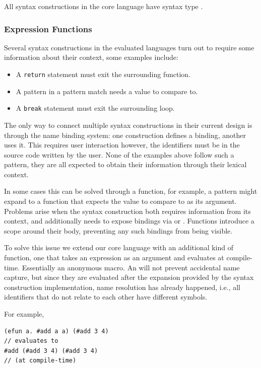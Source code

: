 \documentclass{kththesis}
\begin{document}
All syntax constructions in the core language have syntax type .

\subsubsection{Expression Functions} \label{sec:efun-drawbacks}

Several syntax constructions in the evaluated languages turn out to require some information about their context, some examples include:

\begin{itemize}
  \item A \texttt{return} statement must exit the surrounding function.
  \item A pattern in a pattern match needs a value to compare to.
  \item A \texttt{break} statement must exit the surrounding loop.
\end{itemize}

The only way to connect multiple syntax constructions in their current design is through the name binding system: one construction defines a binding, another uses it. This requires user interaction however, the identifiers must be in the source code written by the user. None of the examples above follow such a pattern, they are all expected to obtain their information through their lexical context.

In some cases this can be solved through a function, for example, a pattern might expand to a function that expects the value to compare to as its argument. Problems arise when the syntax construction both requires information from its context, and additionally needs to expose bindings via  or . Functions introduce a scope around their body, preventing any such bindings from being visible.

To solve this issue we extend our core language with an additional kind of function, one that takes an expression as an argument and evaluates at compile-time. Essentially an anonymous macro. An  will not prevent accidental name capture, but since they are evaluated after the expansion provided by the syntax construction implementation, name resolution has already happened, i.e., all identifiers that do not relate to each other have different symbols.

For example,

\begin{verbatim}
(efun a. #add a a) (#add 3 4)
// evaluates to
#add (#add 3 4) (#add 3 4)
// (at compile-time)
\end{verbatim}
\end{document}
